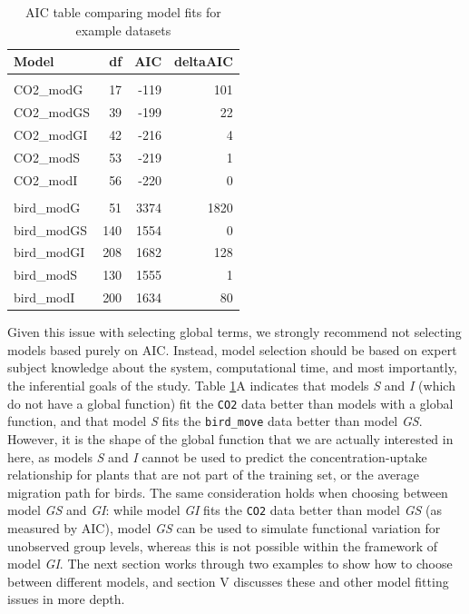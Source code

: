 \documentclass[12pt]{article}
\begin{document}
\begin{table}[t]

\caption{\label{tab:AIC_table_kable}AIC table comparing model fits for example datasets}
\centering
\begin{tabular}{lrrr}
\toprule
Model & df & AIC & deltaAIC\\
\midrule
\addlinespace[0.3em]
\multicolumn{4}{l}{\textbf{A. CO2 models}}\\
\hspace{1em}CO2\_modG & 17 & -119 & 101\\
\hspace{1em}CO2\_modGS & 39 & -199 & 22\\
\hspace{1em}CO2\_modGI & 42 & -216 & 4\\
\hspace{1em}CO2\_modS & 53 & -219 & 1\\
\hspace{1em}CO2\_modI & 56 & -220 & 0\\
\addlinespace[0.3em]
\multicolumn{4}{l}{\textbf{B. bird\_move models}}\\
\hspace{1em}bird\_modG & 51 & 3374 & 1820\\
\hspace{1em}bird\_modGS & 140 & 1554 & 0\\
\hspace{1em}bird\_modGI & 208 & 1682 & 128\\
\hspace{1em}bird\_modS & 130 & 1555 & 1\\
\hspace{1em}bird\_modI & 200 & 1634 & 80\\
\bottomrule
\end{tabular}
\end{table}

Given this issue with selecting global terms, we strongly recommend not
selecting models based purely on AIC. Instead, model selection should be
based on expert subject knowledge about the system, computational time,
and most importantly, the inferential goals of the study. Table
\ref{tab:AIC_table_kable}A indicates that models \emph{S} and \emph{I}
(which do not have a global function) fit the \texttt{CO2} data better
than models with a global function, and that model \emph{S} fits the
\texttt{bird\_move} data better than model \emph{GS}. However, it is the
shape of the global function that we are actually interested in here, as
models \emph{S} and \emph{I} cannot be used to predict the
concentration-uptake relationship for plants that are not part of the
training set, or the average migration path for birds. The same
consideration holds when choosing between model \emph{GS} and \emph{GI}:
while model \emph{GI} fits the \texttt{CO2} data better than model
\emph{GS} (as measured by AIC), model \emph{GS} can be used to simulate
functional variation for unobserved group levels, whereas this is not
possible within the framework of model \emph{GI}. The next section works
through two examples to show how to choose between different models, and
section V discusses these and other model fitting issues in more depth.
\end{document}
